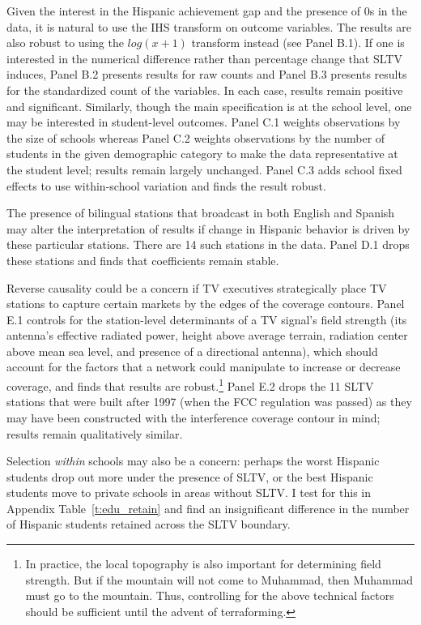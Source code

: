 \documentclass[11pt]{article}
\begin{document}
Given the interest in the Hispanic achievement gap and the presence of 0s in the data, it is natural to use the IHS transform on outcome variables. The results are also robust to using the $log(x+1)$ transform instead (see Panel B.1). If one is interested in the numerical difference rather than percentage change that SLTV induces, Panel B.2 presents results for raw counts and Panel B.3 presents results for the standardized count of the variables. In each case, results remain positive and significant. Similarly, though the main specification is at the school level, one may be interested in student-level outcomes. Panel C.1 weights observations by the size of schools whereas Panel C.2 weights observations by the number of students in the given demographic category to make the data representative at the student level; results remain largely unchanged. Panel C.3 adds school fixed effects to use within-school variation and finds the result robust.

The presence of bilingual stations that broadcast in both English and Spanish may alter the interpretation of results if change in Hispanic behavior is driven by these particular stations. There are 14 such stations in the data. Panel D.1 drops these stations and finds that coefficients remain stable. 

Reverse causality could be a concern if TV executives strategically place TV stations to capture certain markets by the edges of the coverage contours. Panel E.1 controls for the station-level determinants of a TV signal's field strength (its antenna's effective radiated power, height above average terrain, radiation center above mean sea level, and presence of a directional antenna), which should account for the factors that a network could manipulate to increase or decrease coverage, and finds that results are robust.\footnote{In practice, the local topography is also important for determining field strength. But if the mountain will not come to Muhammad, then Muhammad must go to the mountain. Thus, controlling for the above technical factors should be sufficient until the advent of terraforming.} Panel E.2 drops the 11 SLTV stations that were built after 1997 (when the FCC regulation was passed) as they may have been constructed with the interference coverage contour in mind; results remain qualitatively similar.

Selection \textit{within} schools may also be a concern: perhaps the worst Hispanic students drop out more under the presence of SLTV, or the best Hispanic students move to private schools in areas without SLTV. I test for this in Appendix Table~\ref{t:edu_retain} and find an insignificant difference in the number of Hispanic students retained across the SLTV boundary.
\end{document}
